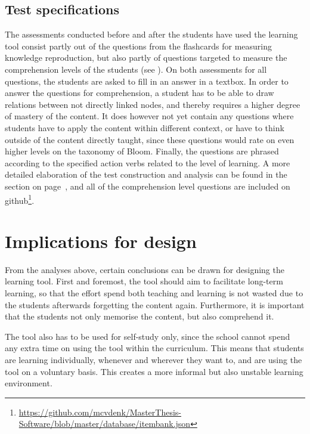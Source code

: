 
\subsection{Test specifications}

The assessments conducted before and after the students have used the learning tool consist partly out of the questions from the flashcards for measuring knowledge reproduction, but also partly of questions targeted to measure the comprehension levels of the students (see ). On both assessments for all questions, the students are asked to fill in an answer in a textbox. In order to answer the questions for comprehension, a student has to be able to draw relations between not directly linked nodes, and thereby requires a higher degree of mastery of the content. It does however not yet contain any questions where students have to apply the content within different context, or have to think outside of the content directly taught, since these questions would rate on even higher levels on the taxonomy of Bloom. Finally, the questions are phrased according to the specified action verbs related to the level of learning. A more detailed elaboration of the test construction and analysis can be found in the  section on page~\pageref{sec:instrumentation}, and all of the comprehension level questions are included on github\footnote{\url{https://github.com/mcvdenk/MasterThesis-Software/blob/master/database/itembank.json}}.

\section{Implications for design}

From the analyses above, certain conclusions can be drawn for designing the learning tool. First and foremost, the tool should aim to facilitate long-term learning, so that the effort spend both teaching and learning is not wasted due to the students afterwards forgetting the content again. Furthermore, it is important that the students not only memorise the content, but also comprehend it.

The tool also has to be used for self-study only, since the school cannot spend any extra time on using the tool within the curriculum. This means that students are learning individually, whenever and wherever they want to, and are using the tool on a voluntary basis. This creates a more informal but also unstable learning environment.

